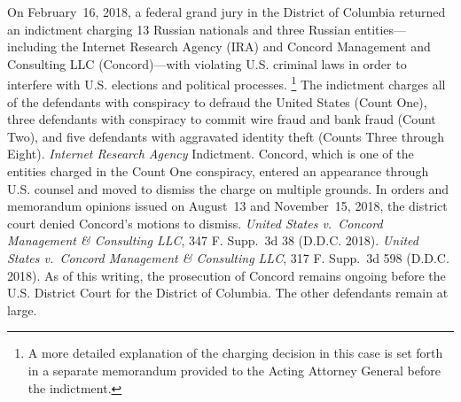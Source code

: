 On February~16, 2018, a federal grand jury in the District of Columbia returned an indictment charging 13 Russian nationals and three Russian entities---including the Internet Research Agency (IRA) and Concord Management and Consulting LLC (Concord)---with violating U.S. criminal laws in order to interfere with U.S. elections and political processes.%
\footnote{A more detailed explanation of the charging decision in this case is set forth in a separate memorandum provided to the Acting Attorney General before the indictment.}
The indictment charges all of the defendants with conspiracy to defraud the United States (Count One), three defendants with conspiracy to commit wire fraud and bank fraud (Count Two), and five defendants with aggravated identity theft (Counts Three through Eight).
\textit{Internet Research Agency} Indictment.
Concord, which is one of the entities charged in the Count One conspiracy, entered an appearance through U.S. counsel and moved to dismiss the charge on multiple grounds.
In orders and memorandum opinions issued on August~13 and November~15, 2018, the district court denied Concord's motions to dismiss.
\textit{United States v.\ Concord Management \& Consulting LLC}, 347 F. Supp.~3d 38 (D.D.C. 2018).
\textit{United States v.\ Concord Management \& Consulting LLC}, 317 F. Supp.~3d 598 (D.D.C. 2018).
As of this writing, the prosecution of Concord remains ongoing before the U.S. District Court for the District of Columbia.
The other defendants remain at large.

